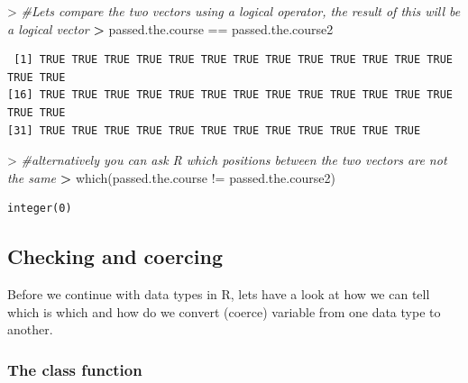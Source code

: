 \documentclass[
]{book}
\newenvironment{Shaded}{\begin{snugshade}}{\end{snugshade}}
\newcommand{\CommentTok}[1]{\textcolor[rgb]{0.56,0.35,0.01}{\textit{#1}}}
\newcommand{\ErrorTok}[1]{\textcolor[rgb]{0.64,0.00,0.00}{\textbf{#1}}}
\newcommand{\FunctionTok}[1]{\textcolor[rgb]{0.00,0.00,0.00}{#1}}
\newcommand{\NormalTok}[1]{#1}
\newcommand{\SpecialCharTok}[1]{\textcolor[rgb]{0.00,0.00,0.00}{#1}}
\theoremstyle{definition}
\theoremstyle{definition}
\theoremstyle{definition}
\theoremstyle{definition}
\theoremstyle{remark}
\begin{document}
\begin{Shaded}
\begin{Highlighting}[]
\SpecialCharTok{\textgreater{}} \CommentTok{\#Lets compare the two vectors using a logical operator, the result of this will be a logical vector}
\ErrorTok{\textgreater{}}\NormalTok{ passed.the.course }\SpecialCharTok{==}\NormalTok{ passed.the.course2}
\end{Highlighting}
\end{Shaded}

\begin{verbatim}
 [1] TRUE TRUE TRUE TRUE TRUE TRUE TRUE TRUE TRUE TRUE TRUE TRUE TRUE TRUE TRUE
[16] TRUE TRUE TRUE TRUE TRUE TRUE TRUE TRUE TRUE TRUE TRUE TRUE TRUE TRUE TRUE
[31] TRUE TRUE TRUE TRUE TRUE TRUE TRUE TRUE TRUE TRUE TRUE TRUE
\end{verbatim}

\begin{Shaded}
\begin{Highlighting}[]
\SpecialCharTok{\textgreater{}} \CommentTok{\#alternatively you can ask R which positions between the two vectors are not the same}
\ErrorTok{\textgreater{}} \FunctionTok{which}\NormalTok{(passed.the.course }\SpecialCharTok{!=}\NormalTok{ passed.the.course2)}
\end{Highlighting}
\end{Shaded}

\begin{verbatim}
integer(0)
\end{verbatim}

\hypertarget{checking-and-coercing}{%
\subsection*{\texorpdfstring{\textbf{Checking and coercing}}{Checking and coercing}}\label{checking-and-coercing}}

Before we continue with data types in R, lets have a look at how we can tell which is which and how
do we convert (coerce) variable from one data type to another.

\hypertarget{the-class-function}{%
\subsubsection*{\texorpdfstring{\textbf{The class function}}{The class function}}\label{the-class-function}}
\end{document}
